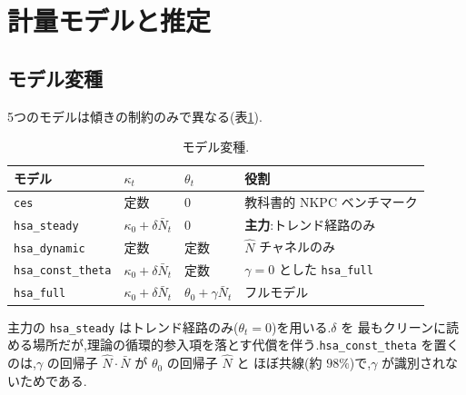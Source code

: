 \documentclass[11pt]{article}
\newcommand{\code}[1]{\texttt{#1}}
\newcommand{\kt}{\kappa_t}
\begin{document}
\section{計量モデルと推定}
\label{sec:model}

\subsection{モデル変種}
5つのモデルは傾きの制約のみで異なる(表\ref{tab:models}).

\begin{table}[H]
\centering
\caption{モデル変種.}
\label{tab:models}
\begin{tabular}{llll}
\toprule
モデル & $\kt$ & $\theta_t$ & 役割 \\
\midrule
\code{ces}             & 定数 & $0$ & 教科書的 NKPC ベンチマーク \\
\code{hsa\_steady}     & $\kappa_0+\delta\bar N_t$ & $0$ & \textbf{主力}:トレンド経路のみ \\
\code{hsa\_dynamic}    & 定数 & 定数 & $\hat N$ チャネルのみ \\
\code{hsa\_const\_theta} & $\kappa_0+\delta\bar N_t$ & 定数 & $\gamma=0$ とした \code{hsa\_full} \\
\code{hsa\_full}       & $\kappa_0+\delta\bar N_t$ & $\theta_0+\gamma\bar N_t$ & フルモデル \\
\bottomrule
\end{tabular}
\end{table}

\noindent 主力の \code{hsa\_steady} はトレンド経路のみ($\theta_t=0$)を用いる.$\delta$ を
最もクリーンに読める場所だが,理論の循環的参入項を落とす代償を伴う.\code{hsa\_const\_theta}
を置くのは,$\gamma$ の回帰子 $\hat N\!\cdot\!\bar N$ が $\theta_0$ の回帰子 $\hat N$ と
ほぼ共線(約 $98\%$)で,$\gamma$ が識別されないためである.
\end{document}
